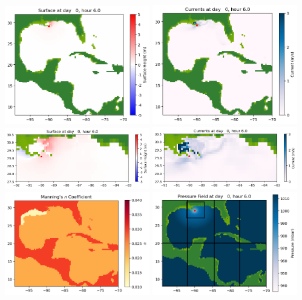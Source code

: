 \documentclass[11pt]{article}
\begin{document}
\vskip 10pt 
\includegraphics[width=0.475\textwidth]{frame0009fig1001.png}
\includegraphics[width=0.475\textwidth]{frame0009fig1002.png}
\vskip 10pt 
\includegraphics[width=0.475\textwidth]{frame0009fig1003.png}
\includegraphics[width=0.475\textwidth]{frame0009fig1004.png}
\vskip 10pt 
\includegraphics[width=0.475\textwidth]{frame0009fig1005.png}
\includegraphics[width=0.475\textwidth]{frame0009fig1006.png}
\end{document}
